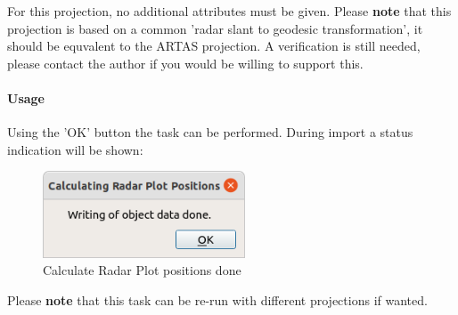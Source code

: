 For this projection, no additional attributes must be given. Please \textbf{note} that this projection is based on a common 'radar slant to geodesic transformation', it should be equvalent to the ARTAS projection. A verification is still needed, please contact the author if you would be willing to support this.

\paragraph{Usage}

Using the 'OK' button the task can be performed. During import a status indication will be shown:

\begin{figure}[H]
  \center
    \includegraphics[width=6cm]{figures/proc_calc_radar_done.png}
  \caption{Calculate Radar Plot positions done}
\end{figure}

Please \textbf{note} that this task can be re-run with different projections if wanted.

